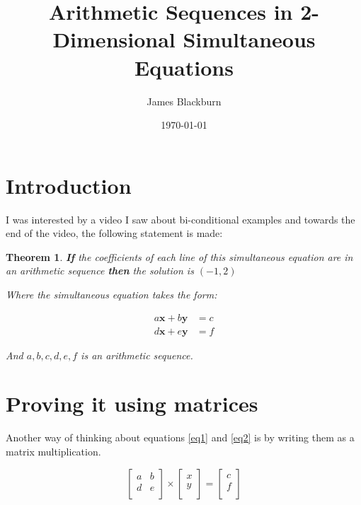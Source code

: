 \documentclass[12pt]{article}
\author{James Blackburn}
\date{\today}
\title{Arithmetic Sequences in 2-Dimensional Simultaneous Equations}
\newtheorem{theorem}{Theorem}
\begin{document}
	\maketitle
	
	\newpage
	\tableofcontents
	
	\newpage
	
	\section{Introduction}
	I was interested by a video \cite{video} I saw 	about bi-conditional examples and towards the end of the video, the following statement is made:
	
	\begin{theorem}
		\textbf{If} the coefficients of each line of this simultaneous equation are in an arithmetic sequence \textbf{then} the solution is \((-1, 2)\)
		
		Where the simultaneous equation takes the form:
		
		\begin{align}
			\label{eq1} a\bm{x} + b\bm{y} &= c \\
			\label{eq2} d\bm{x} + e\bm{y} &= f
		\end{align}
		
		And \(a, b, c, d, e, f\) is an arithmetic sequence.
		
	\end{theorem}


	
	
	\section{Proving it using matrices}

	Another way of thinking about equations \eqref{eq1} and \eqref{eq2} is by writing them as a matrix multiplication.
	
	\begin{equation}\label{matrix solution}
		\left [ \begin{array}{cc} 
			a & b \\
			d & e \\
		 \end{array} \right ] \times
	 	\left [ \begin{array}{c}
	 		x \\
	 		y \\
 		\end{array}\right ] = 
	 	\left [ \begin{array}{c}
	 		c \\
 			f \\
 		\end{array}\right ]
	\end{equation}
\end{document}
